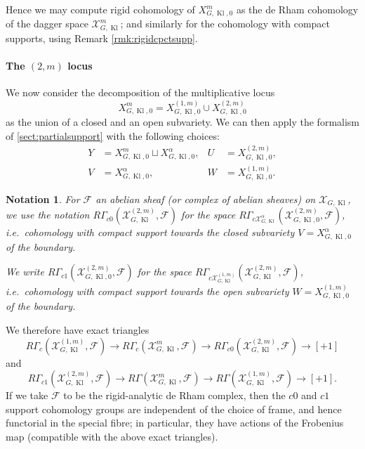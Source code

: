 \documentclass[cjm]{ipart}
\theoremstyle{plain}
\newtheorem{notation}[theorem]{Notation}
\theoremstyle{remark}
\DeclareMathOperator{\Kl}{Kl}
\newcommand{\cF}{\mathcal{F}}
\newcommand{\cX}{\mathcal{X}}
\numberwithin{equation}{subsection}
\begin{document}
   Hence we may compute rigid cohomology of $X_{G, \Kl, 0}^m$ as the de Rham cohomology of the dagger space $\cX_{G, \Kl}^m$; and similarly for the cohomology with compact supports, using Remark \ref{rmk:rigidcpctsupp}.

  \paragraph*{The $(2, m)$ locus} We now consider the decomposition of the multiplicative locus
  \[ X_{G, \Kl, 0}^{m} = X_{G, \Kl, 0}^{(1, m)} \cup X_{G, \Kl, 0}^{(2, m)} \]
  as the union of a closed and an open subvariety. We can then apply the formalism of \cref{sect:partialsupport} with the following choices:
  \begin{align*}
   Y &= X_{G, \Kl, 0}^{m} \sqcup X_{G, \Kl, 0}^{\alpha}, &
   U &= X_{G, \Kl, 0}^{(2, m)}, \\
   V &= X_{G, \Kl, 0}^{\alpha}, &
   W &= X_{G, \Kl, 0}^{(1, m)}.
  \end{align*}

  \begin{notation}
   \label{notation:defc0support}
   For $\cF$ an abelian sheaf (or complex of abelian sheaves) on $\cX_{G, \Kl}$, we use the notation $R\Gamma_{c0}\left(\cX_{G, \Kl}^{(2, m)}, \cF\right)$ for the space $R\Gamma_{c\cX_{G, \Kl}^{\alpha}}\left(\cX_{G, \Kl, 0}^{(2, m)}, \cF\right)$, i.e.~cohomology with compact support towards the closed subvariety $V = X_{G, \Kl,0}^{\alpha}$ of the boundary.

   We write $R\Gamma_{c1}\left(\cX_{G, \Kl, 0}^{(2, m)}, \cF\right)$ for the space $R\Gamma_{c\cX_{G, \Kl}^{(1, m)}}\left(\cX_{G, \Kl}^{(2, m)}, \cF\right)$, i.e.~cohomology with compact support towards the open subvariety $W = X_{G, \Kl, 0}^{(1, m)}$ of the boundary.
  \end{notation}

  We therefore have exact triangles
  \[
   R\Gamma_{c}(\cX_{G, \Kl}^{(1, m)}, \cF) \longrightarrow R\Gamma_{c}(\cX_{G, \Kl}^{m}, \cF) \longrightarrow R\Gamma_{c0}(\cX_{G, \Kl}^{(2, m)}, \cF) \to [+1]
  \]
  and
  \[ R\Gamma_{c1}(\cX_{G, \Kl}^{(2, m)}, \cF) \longrightarrow R\Gamma(\cX_{G, \Kl}^{m}, \cF) \longrightarrow R\Gamma(\cX_{G, \Kl}^{(1, m)}, \cF) \to [+1].
  \]
  If we take $\cF$ to be the rigid-analytic de Rham complex, then the $c0$ and $c1$ support cohomology groups are independent of the choice of frame, and hence functorial in the special fibre; in particular, they have actions of the Frobenius map (compatible with the above exact triangles).
\end{document}
